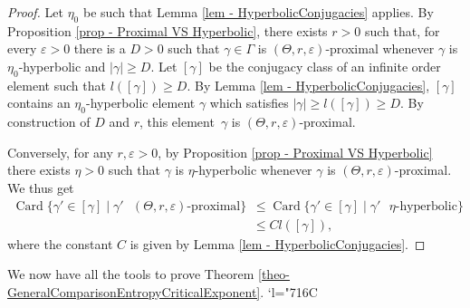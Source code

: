 \documentclass[11pt]{article}
\numberwithin{equation}{section}
\newcommand{\Changelback}{\mathcode`l="716C}
\theoremstyle{definition}
\DeclareMathOperator{\Card}{Card}
\let\epsilon\varepsilon
\let\G\Gamma
\let\g\gamma
\begin{document}
\begin{proof}
Let $\eta_0$ be such that Lemma \ref{lem - HyperbolicConjugacies} applies. By Proposition \ref{prop - Proximal VS Hyperbolic}, there exists $r>0$ such that, for every $\epsilon>0$ there is a $D>0$ such that $\g\in \G$ is $(\Theta,r,\epsilon)$-proximal whenever $\g$ is $\eta_0$-hyperbolic and $\vert \g \vert \geq D$. Let $[\g]$ be the conjugacy class of an infinite order element such that $l([\g]) \geq D$. By Lemma \ref{lem - HyperbolicConjugacies}, $[\g]$ contains an $\eta_0$-hyperbolic element $\g$ which satisfies $\vert \g \vert \geq l([\g])\geq D$. By construction of $D$ and $r$, this element~$\g$ is $(\Theta,r,\epsilon)$-proximal.

Conversely, for any $r,\epsilon>0$, by Proposition \ref{prop - Proximal VS Hyperbolic} there exists $\eta >0$ such that $\g$ is $\eta$-hyperbolic whenever $\g$ is $(\Theta,r,\epsilon)$-proximal. We thus get
\begin{align*}\Card \{\g' \in [\g]\mid \g' \textrm{ $(\Theta,r,\epsilon)$-proximal}\} &\leq \Card \{\g' \in [\g] \mid \g' \textrm{ $\eta$-hyperbolic}\} \\
& \leq C l([\g]),
\end{align*}
where the constant $C$ is given by Lemma \ref{lem - HyperbolicConjugacies}.
\end{proof}

We now have all the tools to prove Theorem \ref{theo-GeneralComparisonEntropyCriticalExponent}.
\Changelback
\end{document}
